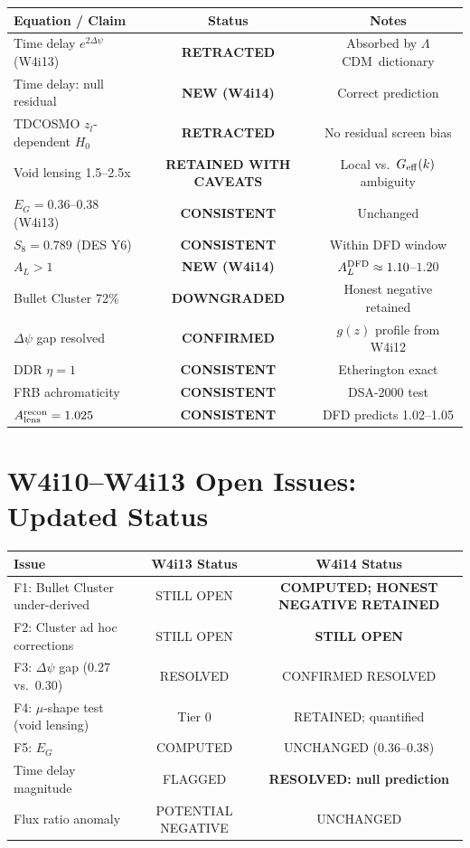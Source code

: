 \documentclass[11pt,a4paper]{article}
\newcommand{\LCDM}{$\Lambda$CDM}
\newcommand{\Geff}{G_{\rm eff}}
\newcommand{\Dpsi}{\Delta\psi}
\begin{document}
\begin{center}
\begin{tabular}{lcc}
\toprule
Equation / Claim & Status & Notes \\
\midrule
Time delay $e^{2\Dpsi}$ (W4i13) & \textbf{RETRACTED} & Absorbed by \LCDM\ dictionary \\
Time delay: null residual & \textbf{NEW (W4i14)} & Correct prediction \\
TDCOSMO $z_l$-dependent $H_0$ & \textbf{RETRACTED} & No residual screen bias \\
Void lensing 1.5--2.5x & \textbf{RETAINED WITH CAVEATS} & Local vs.\ $\Geff(k)$ ambiguity \\
$E_G = 0.36$--$0.38$ (W4i13) & \textbf{CONSISTENT} & Unchanged \\
$S_8 = 0.789$ (DES Y6) & \textbf{CONSISTENT} & Within DFD window \\
$A_L > 1$ & \textbf{NEW (W4i14)} & $A_L^{\rm DFD} \approx 1.10$--$1.20$ \\
Bullet Cluster 72\% & \textbf{DOWNGRADED} & Honest negative retained \\
$\Dpsi$ gap resolved & \textbf{CONFIRMED} & $g(z)$ profile from W4i12 \\
DDR $\eta = 1$ & \textbf{CONSISTENT} & Etherington exact \\
FRB achromaticity & \textbf{CONSISTENT} & DSA-2000 test \\
$A_{\rm lens}^{\rm recon} = 1.025$ & \textbf{CONSISTENT} & DFD predicts 1.02--1.05 \\
\bottomrule
\end{tabular}
\end{center}


\section{W4i10--W4i13 Open Issues: Updated Status}

\begin{center}
\begin{tabular}{lcc}
\toprule
Issue & W4i13 Status & W4i14 Status \\
\midrule
F1: Bullet Cluster under-derived & STILL OPEN & \textbf{COMPUTED; HONEST NEGATIVE RETAINED} \\
F2: Cluster ad hoc corrections & STILL OPEN & \textbf{STILL OPEN} \\
F3: $\Dpsi$ gap (0.27 vs.\ 0.30) & RESOLVED & CONFIRMED RESOLVED \\
F4: $\mu$-shape test (void lensing) & Tier 0 & RETAINED; quantified \\
F5: $E_G$ & COMPUTED & UNCHANGED ($0.36$--$0.38$) \\
Time delay magnitude & FLAGGED & \textbf{RESOLVED: null prediction} \\
Flux ratio anomaly & POTENTIAL NEGATIVE & UNCHANGED \\
\bottomrule
\end{tabular}
\end{center}
\end{document}
